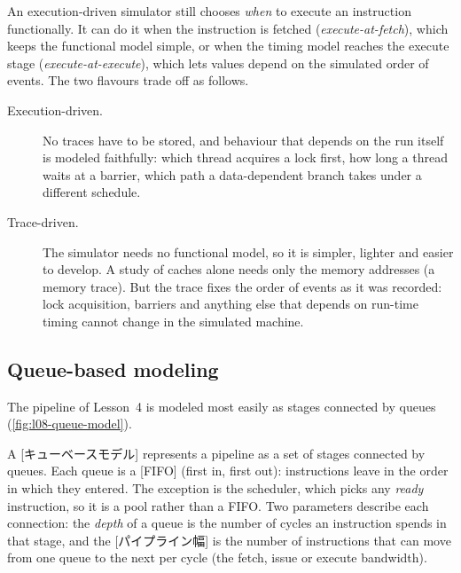 \documentclass[../main.tex]{subfiles}
\begin{document}
An execution-driven simulator still chooses \emph{when} to execute an
instruction functionally.  It can do it when the instruction is
fetched (\emph{execute-at-fetch}), which keeps the functional model
simple, or when the timing model reaches the execute stage
(\emph{execute-at-execute}), which lets values depend on the simulated
order of events.  The two flavours trade off as follows.
\begin{description}
  \item[Execution-driven.]  No traces have to be stored, and behaviour
    that depends on the run itself is modeled faithfully: which thread
    acquires a lock first, how long a thread waits at a barrier, which
    path a data-dependent branch takes under a different schedule.
  \item[Trace-driven.]  The simulator needs no functional model, so it
    is simpler, lighter and easier to develop.  A study of caches alone
    needs only the memory addresses (a memory trace).  But the trace
    fixes the order of events as it was recorded: lock acquisition,
    barriers and anything else that depends on run-time timing cannot
    change in the simulated machine.
\end{description}

\subsection{Queue-based modeling}

The pipeline of Lesson~4 is modeled most easily as stages connected by
queues (\cref{fig:l08-queue-model}).

\begin{definition}
  \label{def:l08-queue-model}
  A [キューベースモデル] represents a pipeline
  as a set of stages connected by queues.  Each queue is a
  [FIFO] (first in, first out): instructions leave in the
  order in which they entered.  The exception is the scheduler, which
  picks any \emph{ready} instruction, so it is a pool rather than a
  FIFO.  Two parameters describe each connection: the \emph{depth} of a
  queue is the number of cycles an instruction spends in that stage,
  and the [パイプライン幅] is the number of
  instructions that can move from one queue to the next per cycle (the
  fetch, issue or execute bandwidth).
\end{definition}
\end{document}
